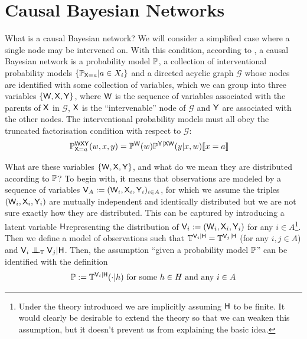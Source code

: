 

\section{Causal Bayesian Networks}\label{sec:CBN}


What is a causal Bayesian network? We will consider a simplified case where a single node may be intervened on. With this condition, according to \citet{pearl_causality:_2009}, a causal Bayesian network is a probability model $\mathbb{P}$, a collection of interventional probability models $\{\mathbb{P}_{\mathsf{X}=a}|a\in X_i\}$ and a directed acyclic graph $\mathcal{G}$ whose nodes are identified with some collection of variables, which we can group into three variables $\{\mathsf{W},\mathsf{X},\mathsf{Y}\}$, where $\mathsf{W}$ is the sequence of variables associated with the parents of $\mathsf{X}$ in $\mathcal{G}$, $\mathsf{X}$ is the ``intervenable'' node of $\mathcal{G}$ and $\mathsf{Y}$ are associated with the other nodes. The interventional probability models must all obey the truncated factorisation condition with respect to $\mathcal{G}$:
\begin{align}
    \mathbb{P}_{\mathsf{X}=a}^{\mathsf{W}\mathsf{X}\mathsf{Y}}(w,x,y) &= \mathbb{P}^{\mathsf{W}}(w)\mathbb{P}^{\mathsf{Y}|\mathsf{XW}}(y|x,w)\llbracket x=a \rrbracket\label{eq:truncated_fac2}
\end{align}


What are these variables $\{\mathsf{W},\mathsf{X},\mathsf{Y}\}$, and what do we mean they are distributed according to $\mathbb{P}$? To begin with, it means that observations are modeled by a sequence of variables $\mathsf{V}_A:=(\mathsf{W}_i,\mathsf{X}_i,\mathsf{Y}_i)_{i\in A}$, for which we assume the triples $(\mathsf{W}_i,\mathsf{X}_i,\mathsf{Y}_i)$ are mutually independent and identically distributed but we are not sure exactly how they are distributed. This can be captured by introducing a latent variable $\mathsf{H}$representing the distribution of $\mathsf{V}_i:=(\mathsf{W}_i,\mathsf{X}_i,\mathsf{Y}_i)$ for any $i\in A$\footnote{Under the theory introduced we are implicitly assuming $\mathsf{H}$ to be finite. It would clearly be desirable to extend the theory so that we can weaken this assumption, but it doesn't prevent us from explaining the basic idea.}. Then we define a model of observations such that $\mathbb{T}^{\mathsf{V}_i|\mathsf{H}}=\mathbb{T}^{\mathsf{V}_j|\mathsf{H}}$ (for any $i,j\in A$) and $\RV{V}_i\CI_{\model{T}}\RV{V}_j|\RV{H}$. Then, the assumption ``given a probability model $\mathbb{P}$'' can be identified with the definition 
\begin{align}
    \mathbb{P}:=\mathbb{T}^{\mathsf{V}_i|\mathsf{H}}(\cdot|h)\text{ for some }h\in H\text{ and any }i\in A\label{eq:what_is_p}
\end{align}

